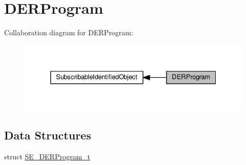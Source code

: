 \hypertarget{group__DERProgram}{}\section{D\+E\+R\+Program}
\label{group__DERProgram}
Collaboration diagram for D\+E\+R\+Program\+:\nopagebreak
\begin{figure}[H]
\begin{center}
\leavevmode
\includegraphics[width=332pt]{group__DERProgram}
\end{center}
\end{figure}
\subsection*{Data Structures}
\begin{DoxyCompactItemize}
\item 
struct \hyperlink{structSE__DERProgram__t}{S\+E\+\_\+\+D\+E\+R\+Program\+\_\+t}
\end{DoxyCompactItemize}
